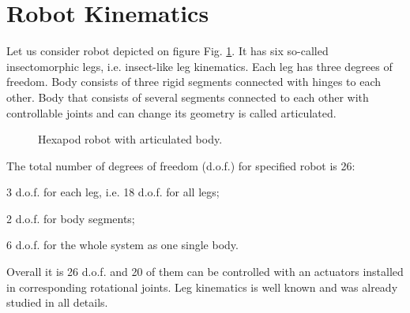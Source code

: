 \documentclass{ws-procs9x6}
\begin{document}

\section{Robot Kinematics}
Let us consider robot depicted on figure Fig. \ref{aba:robot_1}. It has six so-called insectomorphic legs, i.e. insect-like leg kinematics. Each leg has three degrees of freedom. Body consists of three rigid segments connected with hinges to each other. Body that consists of several segments connected to each other with controllable joints and can change its geometry is called articulated.

\begin{figure}
  \begin{center}
  \end{center}
  \caption{Hexapod robot with articulated body.}
  \label{aba:robot_1}
\end{figure}

The total number of degrees of freedom (d.o.f.) for specified robot is 26:
\begin{itemlist}
      \item	3 d.o.f. for each leg, i.e. 18 d.o.f. for all legs;
      \item 2 d.o.f. for body segments;
      \item	6 d.o.f. for the whole system as one single body.
\end{itemlist}
Overall it is 26 d.o.f. and 20 of them can be controlled with an actuators installed in corresponding rotational joints. Leg kinematics is well known and was already studied in all details.


\end{document}
